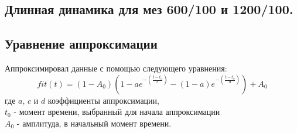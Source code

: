 \documentclass[a4paper,12pt]{article}
\begin{document}
	\begin{center}
		\section{ Длинная динамика для мез 600/100 и 1200/100.}
	\end{center}
	\subsection{Уравнение аппроксимации}
	Аппроксимировал данные с помощью следующего уравнения:
	\begin{equation}
		fit(t) = (1-A_0)\left(1-a e^{- \left(\frac{t - t_o}{c}\right)} - (1-a)e^{- \left(\frac{t - t_o}{d}\right)}\right) + A_0
	\end{equation}
	где $a$, $c$ и $d$ коэффициенты аппроксимации,\\
	$t_0$ - момент времени, выбранный для начала аппроксимации\\
	$A_0$ - амплитуда, в начальный момент времени.
\end{document}
